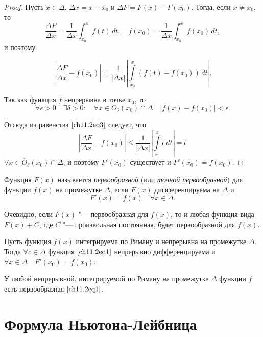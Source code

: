 \begin{proof}
Пусть $x \in \Delta$, $\Delta x = x - x_0$ и $\Delta F = F(x) - F(x_0)$. Тогда, если $x \not= x_0$, то 
$$ 
\frac{\Delta F}{\Delta x} = \frac{1}{\Delta x} \int_{x_0}^{x} f(t) \,dt, \quad f(x_0) = \frac{1}{\Delta x} \int_{x_0}^{x} f(x_0) \,dt,
$$
и поэтому 

\begin{equation} \label{ch11.2eq3}
\left| \frac{\Delta F}{\Delta x} - f(x_0) \right| = \frac{1}{|\Delta x|} \left| \int\limits_{x_0}^{x} \left( f(t) - f(x_0) \right) \,dt \right|.
\end{equation}

Так как функция $f$ непрерывна в точке $x_0$, то
$$
\forall \epsilon > 0 \quad \exists \delta > 0 : \quad \forall x \in O_\delta(x_0) \cap \Delta \quad |f(x) - f(x_0)| < \epsilon.
$$

Отсюда из равенства $\eqref{ch11.2eq3}$ следует, что 
$$
\left| \frac{\Delta F}{\Delta x} - f(x_0) \right| \le \frac{1}{|\Delta x|} \left| \int\limits_{x_0}^{x} \epsilon \,dt\right| = \epsilon
$$
$\forall x \in \overset{\circ}{O}_\delta(x_0) \cap \Delta$, и поэтому $F'(x_0)$  существует и $F'(x_0) = f(x_0).$
\end{proof}

\begin{defn}
Функция $F(x)$ называется \textit{первообразной} (или \textit{точной первообразной}) для функции $f(x)$ на промежутке  $\Delta$, если $F(x)$ дифференцируема на $\Delta$ и
$$
F'(x) = f(x) \quad \forall x \in \Delta.
$$

Очевидно, если $F(x)$ "--- первообразная для $f(x)$, то и любая функция вида $F(x) + C$,  где $C$ "--- произвольная постоянная, будет первообразной для $f(x)$. 
\end{defn}

\begin{cons}
Пусть функция $f(x)$ интегрируема по Риману и непрерывна на промежутке $\Delta$. Тогда $\forall c \in \Delta$ функция $\eqref{ch11.2eq1}$ непрерывно дифференцируема и $\forall x \in \Delta \quad F'(x_0) = f(x_0)$. 
\end{cons}
У  любой непрерывной, интегрируемой по Риману на промежутке $\Delta$ функции $f$ есть первообразная $\eqref{ch11.2eq1}$.

\section[Формула Ньютона-Лейбница]{Формула Ньютона-Лейбница}

